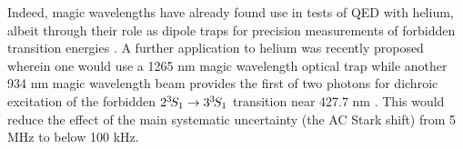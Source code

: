 	Indeed, magic wavelengths have already found use in tests of QED with helium, albeit through their role as dipole traps for precision measurements of forbidden transition energies \cite{Rengelink18}.
	A further application to helium was recently proposed wherein one would use a 1265 nm magic wavelength optical trap while another 934 nm magic wavelength beam provides the first of two photons for dichroic excitation of the forbidden $2^{3\!} S_1\rightarrow 3^{3\!} S_1$ transition near 427.7 nm \cite{Thomas20, Zhang21_forbidden}.
	This would reduce the effect of the main systematic uncertainty (the AC Stark shift) from 5 MHz to below 100 kHz.



	
	
	

